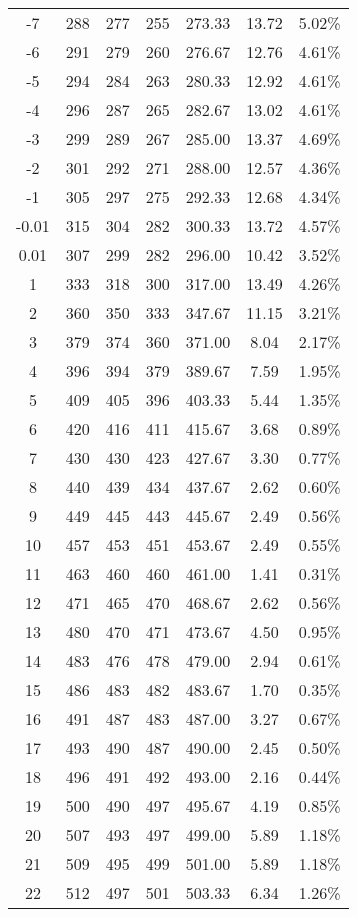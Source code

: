 \begin{table*}
\begin{tabular}{c c c c c c c}
    -7&288   &277&255&273.33&13.72&5.02\% \\
    -6&291   &279&260&276.67&12.76&4.61\% \\
    -5&294   &284&263&280.33&12.92&4.61\% \\
    -4&296   &287&265&282.67&13.02&4.61\% \\
    -3&299   &289&267&285.00&13.37&4.69\% \\
    -2&301   &292&271&288.00&12.57&4.36\% \\
    -1&305   &297&275&292.33&12.68&4.34\% \\
    -0.01&315   &304&282&300.33&13.72&4.57\% \\
    0.01&307    &299&282&296.00&10.42&3.52\% \\
    1&333    &318&300&317.00&13.49&4.26\% \\
    2&360    &350&333&347.67&11.15&3.21\% \\
    3&379    &374&360&371.00&8.04&2.17\% \\
    4&396    &394&379&389.67&7.59&1.95\% \\
    5&409    &405&396&403.33&5.44&1.35\% \\
    6&420    &416&411&415.67&3.68&0.89\% \\
    7&430    &430&423&427.67&3.30&0.77\% \\
    8&440    &439&434&437.67&2.62&0.60\% \\
    9&449    &445&443&445.67&2.49&0.56\% \\
    10&457   &453&451&453.67&2.49&0.55\% \\
    11&463   &460&460&461.00&1.41&0.31\% \\
    12&471   &465&470&468.67&2.62&0.56\% \\
    13&480   &470&471&473.67&4.50&0.95\% \\
    14&483   &476&478&479.00&2.94&0.61\% \\
    15&486   &483&482&483.67&1.70&0.35\% \\
    16&491   &487&483&487.00&3.27&0.67\% \\
    17&493   &490&487&490.00&2.45&0.50\% \\
    18&496   &491&492&493.00&2.16&0.44\% \\
    19&500   &490&497&495.67&4.19&0.85\% \\
    20&507   &493&497&499.00&5.89&1.18\% \\
    21&509   &495&499&501.00&5.89&1.18\% \\
    22&512   &497&501&503.33&6.34&1.26\% \\

\end{tabular}
\end{table*}
